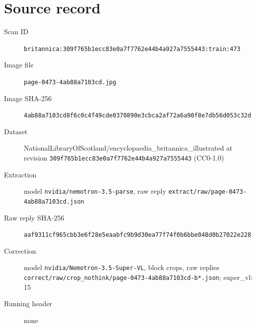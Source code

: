 \documentclass{article}
\begin{document}
\section*{Source record}
\begin{description}
\item[Scan ID] \texttt{britannica:309f765b1ecc83e0a7f7762e44b4a927a7555443:train:473}
\item[Image file] \texttt{page-0473-4ab88a7103cd.jpg}
\item[Image SHA-256] \texttt{4ab88a7103cd8f6c0c4f49cde0370890e3cbca2af72a6a90f8e7db56d053c32d}
\item[Dataset] NationalLibraryOfScotland/encyclopaedia\_britannica\_illustrated at revision \texttt{309f765b1ecc83e0a7f7762e44b4a927a7555443} (CC0-1.0)
\item[Extraction] model \texttt{nvidia/nemotron-3.5-parse}, raw reply \texttt{extract/raw/page-0473-4ab88a7103cd.json}
\item[Raw reply SHA-256] \texttt{aaf9311cf965cbb3e6f28e5eaabfc9b9d30ea77f74f0b6bbe048d0b27022e228}
\item[Correction] model \texttt{nvidia/Nemotron-3.5-Super-VL}, block crops, raw replies \texttt{correct/raw/crop\_nothink/page-0473-4ab88a7103cd-b*.json}; super\_vl: 15
\item[Running header] none
\end{description}
\end{document}

